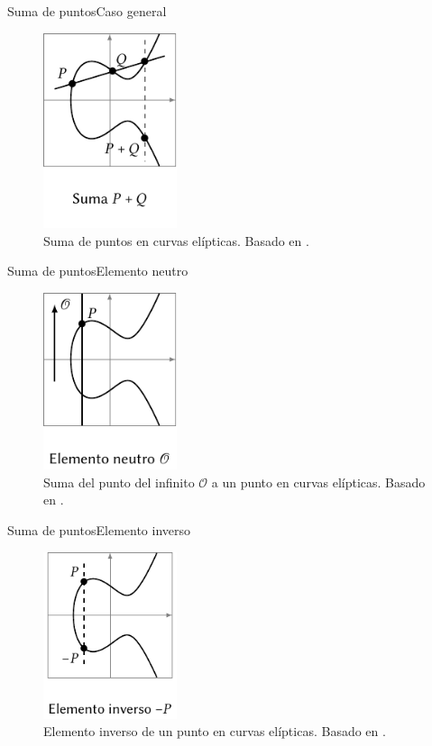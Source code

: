 \documentclass[spanish]{beamer}
\begin{document}
\begin{frame}{Suma de puntos}{Caso general}
  \begin{figure}[h]
    \centering
    \includegraphics[width=0.35\textwidth]{img/suma-curvas}
    \caption{Suma de puntos en curvas elípticas. Basado en  \parencite{eichlseder_elliptic_2016}.}
    \label{fig:suma-curvas}
  \end{figure}
\end{frame}

\begin{frame}{Suma de puntos}{Elemento neutro}
  \begin{figure}[h]
    \centering
    \includegraphics[width=0.35\textwidth]{img/neutro-curvas}
    \caption{Suma del punto del infinito \(\mathcal O\) a un punto en curvas elípticas. Basado en  \parencite{eichlseder_elliptic_2016}.}
    \label{fig:duplicar-curvas}
  \end{figure}
\end{frame}

\begin{frame}{Suma de puntos}{Elemento inverso}
  \begin{figure}[h]
    \centering
    \includegraphics[width=0.35\textwidth]{img/inverso-curvas}
    \caption{Elemento inverso de un punto en curvas elípticas. Basado en  \parencite{eichlseder_elliptic_2016}.}
    \label{fig:inverso-curvas}
  \end{figure}
\end{frame}
\end{document}
